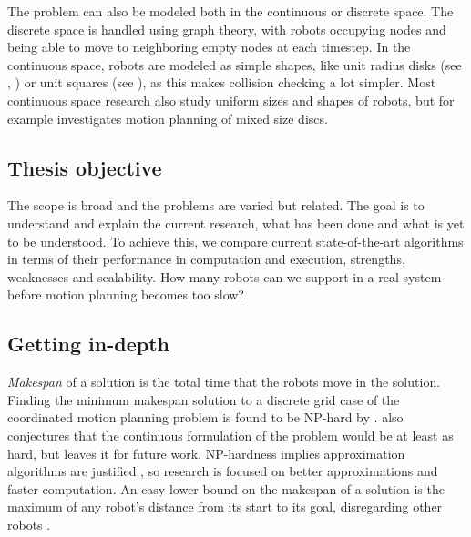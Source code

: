 The problem can also be modeled both in the continuous or discrete space. 
The discrete space is handled using graph theory, with robots occupying nodes and being able to move to neighboring empty nodes at each timestep.
In the continuous space, robots are modeled as simple shapes,
like unit radius disks (see \cite{siamcomp/DemaineFKMS19}, \cite{compgeom/BanyassadyBBBFH22}) or unit squares (see \cite{yangCoordinatedPathPlanning2022}), as this makes collision checking a lot simpler. 
Most continuous space research also study uniform sizes and shapes of robots, but for example \cite{fun/BrockenHKLS21} investigates motion planning of mixed size discs. 




\subsection{Thesis objective}

The scope is broad and the problems are varied but related. 
The goal is to understand and explain the current research, what has been done and what is yet to be understood. 
To achieve this,  we compare current state-of-the-art algorithms in terms of their performance in computation and execution, strengths, weaknesses and scalability. How many robots can we support in a real system before motion planning becomes too slow? 


\subsection{Getting in-depth}



\emph{Makespan} of a solution is the total time that the robots move in the solution. 
Finding the minimum makespan solution to a discrete grid case of the coordinated motion planning problem is found to be NP-hard by \cite{siamcomp/DemaineFKMS19}. \cite{siamcomp/DemaineFKMS19} also conjectures that the continuous formulation of the problem would be at least as hard, but leaves it for future work. 
NP-hardness implies approximation algorithms are justified \cite{siamcomp/DemaineFKMS19}, so research is focused on better approximations and faster computation. 
An easy lower bound on the makespan of a solution is the maximum of any robot's distance from its start to its goal, disregarding other robots \cite{siamcomp/DemaineFKMS19}. 


